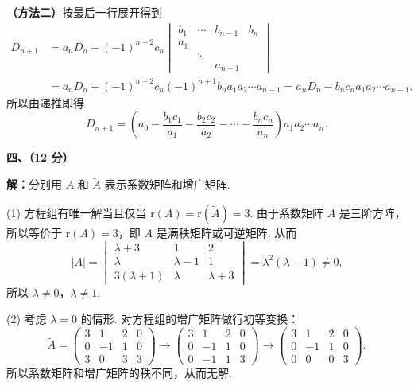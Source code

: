 \documentclass[a4paper,11pt]{ctexart}
\newcommand{\rk}{\mathrm{r}}
\begin{document}
\textbf{（方法二）}按最后一行展开得到
\begin{align*}
  D_{n+1} &= a_n D_n + (-1)^{n+2} c_n \begin{vmatrix}
    b_1 & \cdots & b_{n-1} & b_n \\
    a_1 & & & \\
    & \ddots & & \\
    & & a_{n-1} &
  \end{vmatrix} \\
  &= a_n D_n + (-1)^{n+2} c_n (-1)^{n+1} b_n a_1 a_2 \cdots a_{n-1}
  = a_n D_n - b_n c_n a_1 a_2 \cdots a_{n-1}.
\end{align*}
所以由递推即得
\[
  D_{n+1} = \left(a_0 - \frac{b_1 c_1}{a_1} - \frac{b_2 c_2}{a_2} - \cdots - \frac{b_n c_n}{a_n}\right) a_1 a_2 \cdots a_n.
\]

\vspace{0.8em}

\textbf{四、（12 分）}

\textbf{解：}分别用 $A$ 和 $\widetilde{A}$ 表示系数矩阵和增广矩阵.

(1) 方程组有唯一解当且仅当 $\rk(A) = \rk(\widetilde{A}) = 3$. 由于系数矩阵 $A$ 是三阶方阵，所以等价于 $\rk(A) = 3$，即 $A$ 是满秩矩阵或可逆矩阵. 从而
\[
  |A| = \begin{vmatrix}
    \lambda + 3 & 1 & 2 \\
    \lambda & \lambda - 1 & 1 \\
    3(\lambda + 1) & \lambda & \lambda + 3
  \end{vmatrix} = \lambda^2 (\lambda - 1) \neq 0.
\]
所以 $\lambda \neq 0$，$\lambda \neq 1$.

(2) 考虑 $\lambda = 0$ 的情形. 对方程组的增广矩阵做行初等变换：
\[
  \widetilde{A} = \begin{pmatrix}
    3 & 1 & 2 & 0 \\
    0 & -1 & 1 & 0 \\
    3 & 0 & 3 & 3
  \end{pmatrix}
  \longrightarrow \begin{pmatrix}
    3 & 1 & 2 & 0 \\
    0 & -1 & 1 & 0 \\
    0 & -1 & 1 & 3
  \end{pmatrix}
  \longrightarrow \begin{pmatrix}
    3 & 1 & 2 & 0 \\
    0 & -1 & 1 & 0 \\
    0 & 0 & 0 & 3
  \end{pmatrix}.
\]
所以系数矩阵和增广矩阵的秩不同，从而无解.
\end{document}

